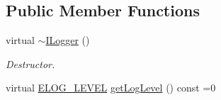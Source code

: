 \subsection*{Public Member Functions}
\begin{DoxyCompactItemize}
\item 
virtual \hyperlink{classirr_1_1ILogger_ae1ceda88c9b97cc1efcefa38588f9116}{$\sim$\+I\+Logger} ()\hypertarget{classirr_1_1ILogger_ae1ceda88c9b97cc1efcefa38588f9116}{}\label{classirr_1_1ILogger_ae1ceda88c9b97cc1efcefa38588f9116}

\begin{DoxyCompactList}\small\item\em Destructor. \end{DoxyCompactList}\item 
virtual \hyperlink{namespaceirr_aa2d1cac68606a25ed24cfffccfa30a92}{E\+L\+O\+G\+\_\+\+L\+E\+V\+EL} \hyperlink{classirr_1_1ILogger_afd7e5a2e6b6a0563df5002a655c3a2da}{get\+Log\+Level} () const  =0\hypertarget{classirr_1_1ILogger_afd7e5a2e6b6a0563df5002a655c3a2da}{}\label{classirr_1_1ILogger_afd7e5a2e6b6a0563df5002a655c3a2da}


\end{DoxyCompactItemize}
